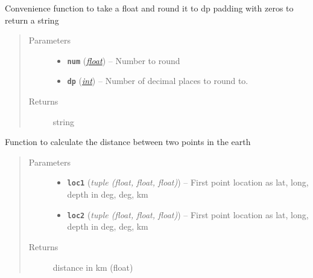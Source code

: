 \documentclass[a4paper,10pt,english]{sphinxmanual}
\begin{document}
\begin{fulllineitems}
\label{utils:catalogue2DD._cc_round}
Convenience function to take a float and round it to dp padding with zeros
to return a string
\begin{quote}\begin{description}
\item[{Parameters}] \leavevmode\begin{itemize}
\item {} 
\textbf{\texttt{num}} (\href{https://docs.python.org/library/functions.html\#float}{\emph{float}}) -- Number to round

\item {} 
\textbf{\texttt{dp}} (\href{https://docs.python.org/library/functions.html\#int}{\emph{int}}) -- Number of decimal places to round to.

\end{itemize}

\item[{Returns}] \leavevmode
string

\end{description}\end{quote}

\end{fulllineitems}


\begin{fulllineitems}
\label{utils:catalogue2DD._separation}
Function to calculate the distance between two points in the earth
\begin{quote}\begin{description}
\item[{Parameters}] \leavevmode\begin{itemize}
\item {} 
\textbf{\texttt{loc1}} (\emph{tuple (float, float, float)}) -- First point location as lat, long, depth in deg, deg, km

\item {} 
\textbf{\texttt{loc2}} (\emph{tuple (float, float, float)}) -- First point location as lat, long, depth in deg, deg, km

\end{itemize}

\item[{Returns}] \leavevmode
distance in km (float)

\end{description}\end{quote}

\end{fulllineitems}
\end{document}
